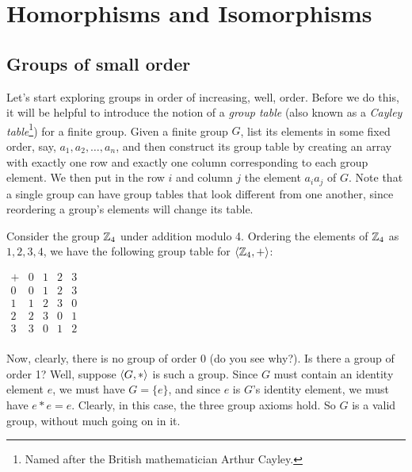 \chapter{Homorphisms and Isomorphisms}\label{homoiso}

\section{Groups of small order}

Let's start exploring groups in order of increasing, well, order. Before we do this, it will be helpful to introduce the notion of a \textit{group table} (also known as a {\it Cayley table}\footnote{Named after the British mathematician Arthur Cayley.}) for a finite group.  Given a finite group $G$, list its elements in some fixed order, say, $a_1, a_2, \ldots, a_n$, and then construct its group table by creating an array with exactly one row and exactly one column corresponding to each group element.  We then put in the row $i$ and column $j$ the element $a_ia_j$ of $G$.  Note that a single group can have group tables that look different from one another, since reordering a group's elements will change its table.


\begin{example}{}
Consider the group $\mathbb{Z}_4$ under addition modulo 4.  Ordering the elements of $\mathbb{Z}_4$ as $1,2,3,4$, we have the following group table for $\langle\mathbb{Z}_4,+\rangle$:

\bigskip
\hspace{137pt}
\renewcommand{\arraystretch}{1.3}
$\begin{array}{c||c|c|c|c}
+&0&1&2&3\\ \hline\hline 0&0&1&2&3\\ \hline
1&1&2&3&0\\ \hline 2&2&3&0&1\\ \hline 3&3&0&1&2\\

\end{array}$

\vspace{-9pt}
\hspace{250pt}
\end{example}


Now, clearly, there is no group of order 0 (do you see why?).  Is there a group of order 1?  Well, suppose $\langle G,*\rangle$ is such a group. Since $G$ must contain an identity element $e$, we must have $G=\{e\}$, and since $e$ is $G$'s identity element, we must have $e*e=e$.  Clearly, in this case, the three group axioms hold.  So $G$ is a valid group, without much going on in it.

